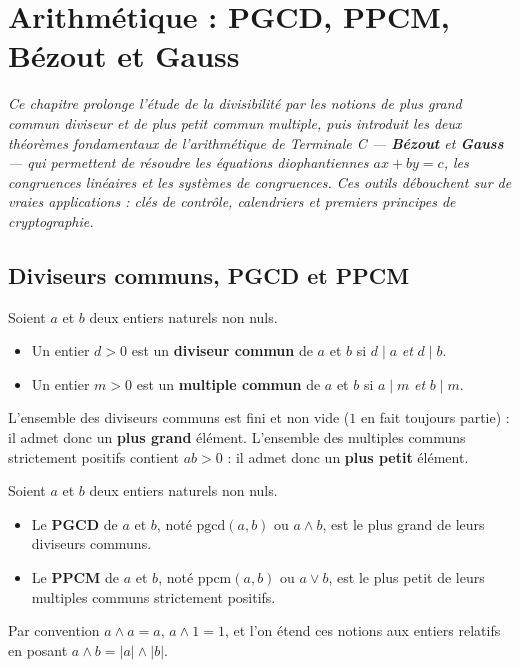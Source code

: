 \chapter{Arithmétique : PGCD, PPCM, Bézout et Gauss}

\noindent\textit{Ce chapitre prolonge l'étude de la divisibilité par les notions de plus
grand commun diviseur et de plus petit commun multiple, puis introduit les deux théorèmes
fondamentaux de l'arithmétique de Terminale C — \textbf{Bézout} et \textbf{Gauss} — qui
permettent de résoudre les équations diophantiennes $ax+by=c$, les congruences linéaires et
les systèmes de congruences. Ces outils débouchent sur de vraies applications : clés de
contrôle, calendriers et premiers principes de cryptographie.}
\vspace{8pt}

\section{Diviseurs communs, PGCD et PPCM}

\begin{definition}
Soient $a$ et $b$ deux entiers naturels non nuls.
\begin{itemize}
\item Un entier $d>0$ est un \textbf{diviseur commun} de $a$ et $b$ si $d\mid a$ \emph{et} $d\mid b$.
\item Un entier $m>0$ est un \textbf{multiple commun} de $a$ et $b$ si $a\mid m$ \emph{et} $b\mid m$.
\end{itemize}
L'ensemble des diviseurs communs est fini et non vide ($1$ en fait toujours partie) : il
admet donc un \textbf{plus grand} élément. L'ensemble des multiples communs strictement
positifs contient $ab>0$ : il admet donc un \textbf{plus petit} élément.
\end{definition}

\begin{definition}
Soient $a$ et $b$ deux entiers naturels non nuls.
\begin{itemize}
\item Le \textbf{PGCD} de $a$ et $b$, noté $\mathrm{pgcd}(a,b)$ ou $a\wedge b$, est le plus grand de leurs diviseurs communs.
\item Le \textbf{PPCM} de $a$ et $b$, noté $\mathrm{ppcm}(a,b)$ ou $a\vee b$, est le plus petit de leurs multiples communs strictement positifs.
\end{itemize}
Par convention $a\wedge a=a$, $a\wedge 1=1$, et l'on étend ces notions aux entiers relatifs
en posant $a\wedge b=|a|\wedge|b|$.
\end{definition}

